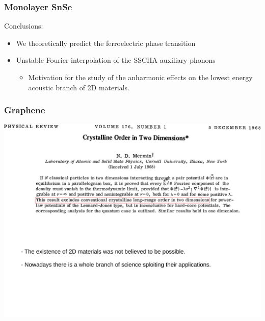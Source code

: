 \documentclass{beamer}
\begin{document}

\begin{frame}

\frametitle{Monolayer SnSe}
Conclusions:
\begin{itemize}
\item We theoretically predict the ferroelectric phase transition
\item Unstable Fourier interpolation of the SSCHA auxiliary phonons
\begin{itemize}
 \item Motivation for the study of the anharmonic effects on the lowest energy acoustic branch of 2D materials.
\end{itemize}
\end{itemize}

\end{frame}


\begin{frame}

\frametitle{Graphene}
\vspace{0.5cm}
\begin{center}
 \includegraphics[width=0.85\linewidth]{Pictures/Graphene/mermin.pdf}
\end{center}

\end{frame}

\end{document}
